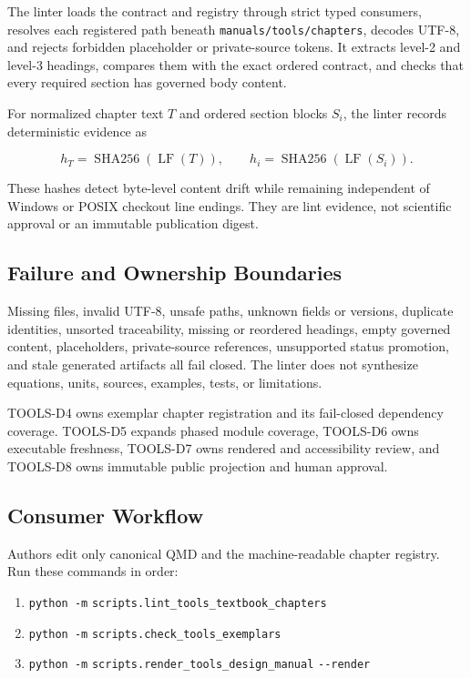 \documentclass[
  american,
]{article}
\providecommand{\tightlist}{%
  \setlength{\itemsep}{0pt}\setlength{\parskip}{0pt}}
\begin{document}
The linter loads the contract and registry through strict typed
consumers, resolves each registered path beneath
\texttt{manuals/tools/chapters}, decodes UTF-8, and rejects forbidden
placeholder or private-source tokens. It extracts level-2 and level-3
headings, compares them with the exact ordered contract, and checks that
every required section has governed body content.

For normalized chapter text \(T\) and ordered section blocks \(S_i\),
the linter records deterministic evidence as

\[
h_T = \operatorname{SHA256}(\operatorname{LF}(T)), \qquad
h_i = \operatorname{SHA256}(\operatorname{LF}(S_i)).
\]

These hashes detect byte-level content drift while remaining independent
of Windows or POSIX checkout line endings. They are lint evidence, not
scientific approval or an immutable publication digest.

\subsection{Failure and Ownership
Boundaries}\label{failure-and-ownership-boundaries}

Missing files, invalid UTF-8, unsafe paths, unknown fields or versions,
duplicate identities, unsorted traceability, missing or reordered
headings, empty governed content, placeholders, private-source
references, unsupported status promotion, and stale generated artifacts
all fail closed. The linter does not synthesize equations, units,
sources, examples, tests, or limitations.

TOOLS-D4 owns exemplar chapter registration and its fail-closed
dependency coverage. TOOLS-D5 expands phased module coverage, TOOLS-D6
owns executable freshness, TOOLS-D7 owns rendered and accessibility
review, and TOOLS-D8 owns immutable public projection and human
approval.

\subsection{Consumer Workflow}\label{consumer-workflow}

Authors edit only canonical QMD and the machine-readable chapter
registry. Run these commands in order:

\begin{enumerate}
\def\labelenumi{\arabic{enumi}.}
\tightlist
\item
  \texttt{python\ -m} \texttt{scripts.lint\_tools\_textbook\_chapters}
\item
  \texttt{python\ -m} \texttt{scripts.check\_tools\_exemplars}
\item
  \texttt{python\ -m} \texttt{scripts.render\_tools\_design\_manual}
  \texttt{-\/-render}
\end{enumerate}
\end{document}
